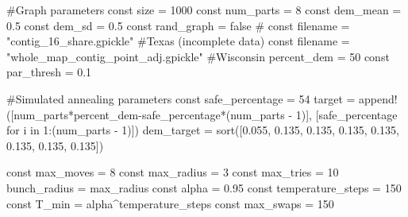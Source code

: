 #Graph parameters
const size = 1000
const num_parts = 8
const dem_mean = 0.5
const dem_sd = 0.5
const rand_graph = false
# const filename = "contig_16_share.gpickle" #Texas (incomplete data)
const filename = "whole_map_contig_point_adj.gpickle" #Wisconsin
percent_dem = 50
const par_thresh = 0.1

#Simulated annealing parameters
const safe_percentage = 54
target = append!([num_parts*percent_dem-safe_percentage*(num_parts - 1)],
                 [safe_percentage for i in 1:(num_parts - 1)])
dem_target = sort([0.055, 0.135, 0.135, 0.135, 0.135, 0.135, 0.135, 0.135])

const max_moves = 8
const max_radius = 3
const max_tries = 10
bunch_radius = max_radius
const alpha = 0.95
const temperature_steps = 150
const T_min = alpha^temperature_steps
const max_swaps = 150